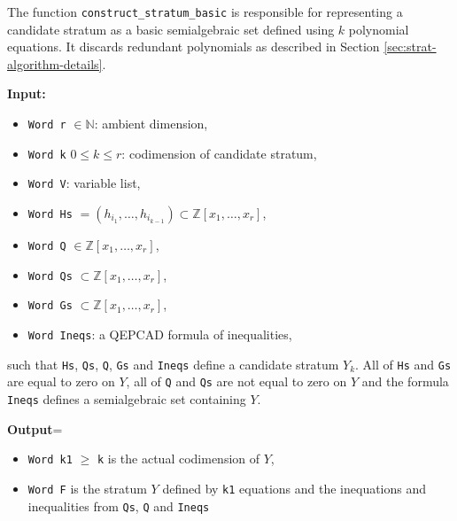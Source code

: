 \documentclass[
]{book}
\providecommand{\tightlist}{%
  \setlength{\itemsep}{0pt}\setlength{\parskip}{0pt}}
\theoremstyle{definition}
\theoremstyle{definition}
\theoremstyle{definition}
\theoremstyle{definition}
\theoremstyle{remark}
\begin{document}
The function \texttt{construct\_stratum\_basic} is responsible for representing a candidate stratum as a basic semialgebraic set defined using \(k\) polynomial equations. It discards redundant polynomials as described in Section \ref{sec:strat-algorithm-details}.

\textbf{Input:}

\begin{itemize}
\tightlist
\item
  \texttt{Word\ r} \(\in \mathbb{N}\): ambient dimension,
\item
  \texttt{Word\ k} \(0 \le k \le r\): codimension of candidate stratum,
\item
  \texttt{Word\ V}: variable list,
\item
  \texttt{Word\ Hs} \(= (h_{i_1},\ldots,h_{i_{k-1}}) \subset \mathbb{Z}[x_1,\ldots,x_r]\),
\item
  \texttt{Word\ Q} \(\in \mathbb{Z}[x_1,\ldots,x_r]\),
\item
  \texttt{Word\ Qs} \(\subset \mathbb{Z}[x_1,\ldots,x_r]\),
\item
  \texttt{Word\ Gs} \(\subset \mathbb{Z}[x_1,\ldots,x_r]\),
\item
  \texttt{Word\ Ineqs}: a QEPCAD formula of inequalities,
\end{itemize}

such that \texttt{Hs}, \texttt{Qs}, \texttt{Q}, \texttt{Gs} and \texttt{Ineqs} define a candidate stratum \(Y_k\). All of \texttt{Hs} and \texttt{Gs} are equal to zero on \(Y\), all of \texttt{Q} and \texttt{Qs} are not equal to zero on \(Y\) and the formula \texttt{Ineqs} defines a semialgebraic set containing \(Y\).

\textbf{Output}=

\begin{itemize}
\tightlist
\item
  \texttt{Word\ k1} \(\ge\) \texttt{k} is the actual codimension of \(Y\),
\item
  \texttt{Word\ F} is the stratum \(Y\) defined by \texttt{k1} equations and the inequations and inequalities from \texttt{Qs}, \texttt{Q} and \texttt{Ineqs}
\end{itemize}
\end{document}
